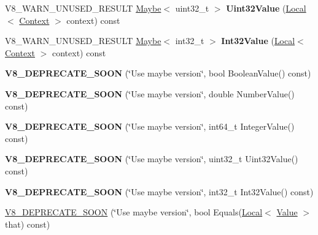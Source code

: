 \begin{DoxyCompactItemize}
\item 
\mbox{\label{classv8_1_1Value_a134829c7f91e19cc371ad8fc4dea24e2}} 
V8\+\_\+\+W\+A\+R\+N\+\_\+\+U\+N\+U\+S\+E\+D\+\_\+\+R\+E\+S\+U\+LT \mbox{\hyperlink{classv8_1_1Maybe}{Maybe}}$<$ uint32\+\_\+t $>$ {\bfseries Uint32\+Value} (\mbox{\hyperlink{classv8_1_1Local}{Local}}$<$ \mbox{\hyperlink{classv8_1_1Context}{Context}} $>$ context) const
\item 
\mbox{\label{classv8_1_1Value_a30efd67e1154427a8995d6b130c47e76}} 
V8\+\_\+\+W\+A\+R\+N\+\_\+\+U\+N\+U\+S\+E\+D\+\_\+\+R\+E\+S\+U\+LT \mbox{\hyperlink{classv8_1_1Maybe}{Maybe}}$<$ int32\+\_\+t $>$ {\bfseries Int32\+Value} (\mbox{\hyperlink{classv8_1_1Local}{Local}}$<$ \mbox{\hyperlink{classv8_1_1Context}{Context}} $>$ context) const
\item 
\mbox{\label{classv8_1_1Value_aff3530eeb271134bbb0b6206d736f00b}} 
{\bfseries V8\+\_\+\+D\+E\+P\+R\+E\+C\+A\+T\+E\+\_\+\+S\+O\+ON} (\char`\"{}Use maybe version\char`\"{}, bool Boolean\+Value() const)
\item 
\mbox{\label{classv8_1_1Value_a2d1835968f05581123c96add5b03c41c}} 
{\bfseries V8\+\_\+\+D\+E\+P\+R\+E\+C\+A\+T\+E\+\_\+\+S\+O\+ON} (\char`\"{}Use maybe version\char`\"{}, double Number\+Value() const)
\item 
\mbox{\label{classv8_1_1Value_a0b08feca02c1c902c094b23ca245fce5}} 
{\bfseries V8\+\_\+\+D\+E\+P\+R\+E\+C\+A\+T\+E\+\_\+\+S\+O\+ON} (\char`\"{}Use maybe version\char`\"{}, int64\+\_\+t Integer\+Value() const)
\item 
\mbox{\label{classv8_1_1Value_a67ef6d2af84b297bb1a6d825915c7f0f}} 
{\bfseries V8\+\_\+\+D\+E\+P\+R\+E\+C\+A\+T\+E\+\_\+\+S\+O\+ON} (\char`\"{}Use maybe version\char`\"{}, uint32\+\_\+t Uint32\+Value() const)
\item 
\mbox{\label{classv8_1_1Value_ac091f8bdb5fc293ec803f16b9780a3b5}} 
{\bfseries V8\+\_\+\+D\+E\+P\+R\+E\+C\+A\+T\+E\+\_\+\+S\+O\+ON} (\char`\"{}Use maybe version\char`\"{}, int32\+\_\+t Int32\+Value() const)
\item 
\mbox{\hyperlink{classv8_1_1Value_ae3528a485935d1b19a0e007cd5a06799}{V8\+\_\+\+D\+E\+P\+R\+E\+C\+A\+T\+E\+\_\+\+S\+O\+ON}} (\char`\"{}Use maybe version\char`\"{}, bool Equals(\mbox{\hyperlink{classv8_1_1Local}{Local}}$<$ \mbox{\hyperlink{classv8_1_1Value}{Value}} $>$ that) const)

\end{DoxyCompactItemize}
